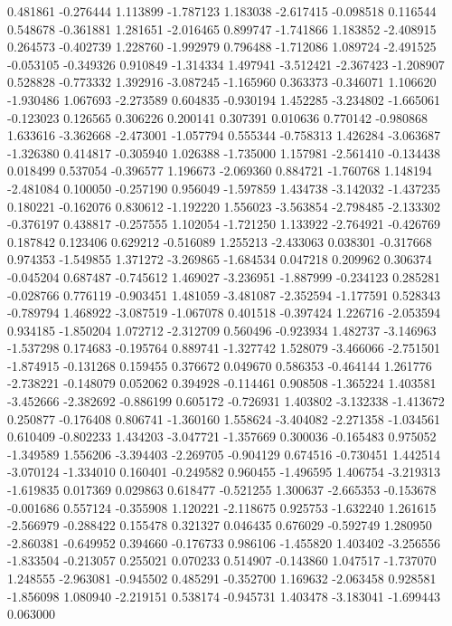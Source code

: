 0.481861
-0.276444
1.113899
-1.787123
1.183038
-2.617415
-0.098518
0.116544
0.548678
-0.361881
1.281651
-2.016465
0.899747
-1.741866
1.183852
-2.408915
0.264573
-0.402739
1.228760
-1.992979
0.796488
-1.712086
1.089724
-2.491525
-0.053105
-0.349326
0.910849
-1.314334
1.497941
-3.512421
-2.367423
-1.208907
0.528828
-0.773332
1.392916
-3.087245
-1.165960
0.363373
-0.346071
1.106620
-1.930486
1.067693
-2.273589
0.604835
-0.930194
1.452285
-3.234802
-1.665061
-0.123023
0.126565
0.306226
0.200141
0.307391
0.010636
0.770142
-0.980868
1.633616
-3.362668
-2.473001
-1.057794
0.555344
-0.758313
1.426284
-3.063687
-1.326380
0.414817
-0.305940
1.026388
-1.735000
1.157981
-2.561410
-0.134438
0.018499
0.537054
-0.396577
1.196673
-2.069360
0.884721
-1.760768
1.148194
-2.481084
0.100050
-0.257190
0.956049
-1.597859
1.434738
-3.142032
-1.437235
0.180221
-0.162076
0.830612
-1.192220
1.556023
-3.563854
-2.798485
-2.133302
-0.376197
0.438817
-0.257555
1.102054
-1.721250
1.133922
-2.764921
-0.426769
0.187842
0.123406
0.629212
-0.516089
1.255213
-2.433063
0.038301
-0.317668
0.974353
-1.549855
1.371272
-3.269865
-1.684534
0.047218
0.209962
0.306374
-0.045204
0.687487
-0.745612
1.469027
-3.236951
-1.887999
-0.234123
0.285281
-0.028766
0.776119
-0.903451
1.481059
-3.481087
-2.352594
-1.177591
0.528343
-0.789794
1.468922
-3.087519
-1.067078
0.401518
-0.397424
1.226716
-2.053594
0.934185
-1.850204
1.072712
-2.312709
0.560496
-0.923934
1.482737
-3.146963
-1.537298
0.174683
-0.195764
0.889741
-1.327742
1.528079
-3.466066
-2.751501
-1.874915
-0.131268
0.159455
0.376672
0.049670
0.586353
-0.464144
1.261776
-2.738221
-0.148079
0.052062
0.394928
-0.114461
0.908508
-1.365224
1.403581
-3.452666
-2.382692
-0.886199
0.605172
-0.726931
1.403802
-3.132338
-1.413672
0.250877
-0.176408
0.806741
-1.360160
1.558624
-3.404082
-2.271358
-1.034561
0.610409
-0.802233
1.434203
-3.047721
-1.357669
0.300036
-0.165483
0.975052
-1.349589
1.556206
-3.394403
-2.269705
-0.904129
0.674516
-0.730451
1.442514
-3.070124
-1.334010
0.160401
-0.249582
0.960455
-1.496595
1.406754
-3.219313
-1.619835
0.017369
0.029863
0.618477
-0.521255
1.300637
-2.665353
-0.153678
-0.001686
0.557124
-0.355908
1.120221
-2.118675
0.925753
-1.632240
1.261615
-2.566979
-0.288422
0.155478
0.321327
0.046435
0.676029
-0.592749
1.280950
-2.860381
-0.649952
0.394660
-0.176733
0.986106
-1.455820
1.403402
-3.256556
-1.833504
-0.213057
0.255021
0.070233
0.514907
-0.143860
1.047517
-1.737070
1.248555
-2.963081
-0.945502
0.485291
-0.352700
1.169632
-2.063458
0.928581
-1.856098
1.080940
-2.219151
0.538174
-0.945731
1.403478
-3.183041
-1.699443
0.063000
